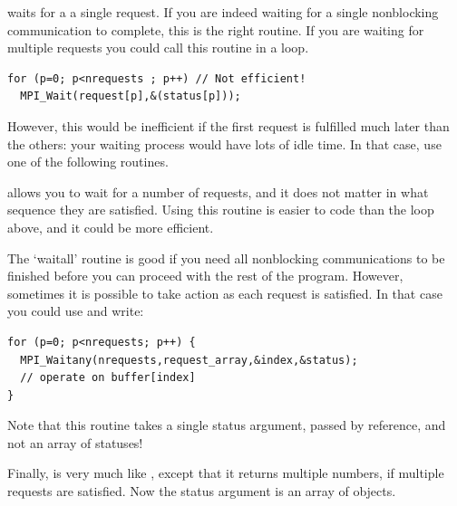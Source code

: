 
 waits for a a single request. If you are
indeed waiting for a single nonblocking communication to complete,
this is the right routine. If you are waiting for multiple requests
you could call this routine in a loop.

\begin{lstlisting}
for (p=0; p<nrequests ; p++) // Not efficient!
  MPI_Wait(request[p],&(status[p]));
\end{lstlisting}

However, this would be inefficient if the first request is fulfilled
much later than the others: your waiting process would have lots of
idle time. In that case, use one of the following routines.

  
 allows you to wait for a number of
requests, and it does not matter in what sequence they are
satisfied. Using this routine is easier to code than the loop above,
and it could be more efficient.



The `waitall' routine is good if you need all nonblocking
communications to be finished before you can proceed with the rest of
the program. However, sometimes it is possible to take action as each
request is satisfied. In that case you could use
 and write:

\begin{lstlisting}
for (p=0; p<nrequests; p++) {
  MPI_Waitany(nrequests,request_array,&index,&status);
  // operate on buffer[index]
}
\end{lstlisting}

Note that this routine takes a single status argument, passed by
reference, and not an array of statuses!


Finally,  is very much like ,
except that it returns multiple numbers, if multiple requests are
satisfied. Now the status argument is an array of 
objects.

